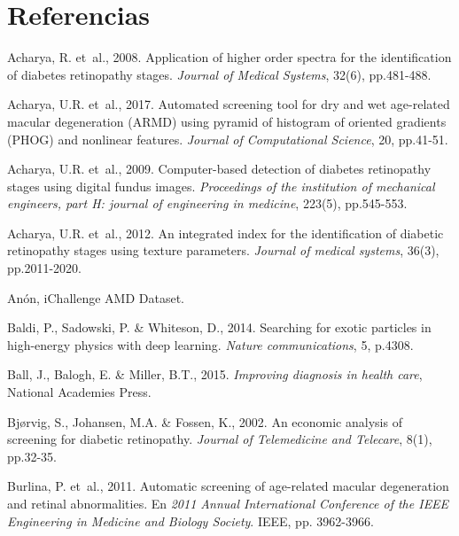 \documentclass[
  12pt,
  spanish,
  a4paperpaper,
]{report}
\begin{document}
\footnotesize

\hypertarget{referencias}{%
\chapter*{Referencias}\label{referencias}}

\hypertarget{refs}{}
\leavevmode\hypertarget{ref-acharya2008application}{}%
Acharya, R. et~al., 2008. Application of higher order spectra for the
identification of diabetes retinopathy stages. \emph{Journal of Medical
Systems}, 32(6), pp.481-488.

\leavevmode\hypertarget{ref-acharya2017automated}{}%
Acharya, U.R. et~al., 2017. Automated screening tool for dry and wet
age-related macular degeneration (ARMD) using pyramid of histogram of
oriented gradients (PHOG) and nonlinear features. \emph{Journal of
Computational Science}, 20, pp.41-51.

\leavevmode\hypertarget{ref-acharya2009computer}{}%
Acharya, U.R. et~al., 2009. Computer-based detection of diabetes
retinopathy stages using digital fundus images. \emph{Proceedings of the
institution of mechanical engineers, part H: journal of engineering in
medicine}, 223(5), pp.545-553.

\leavevmode\hypertarget{ref-acharya2012integrated}{}%
Acharya, U.R. et~al., 2012. An integrated index for the identification
of diabetic retinopathy stages using texture parameters. \emph{Journal
of medical systems}, 36(3), pp.2011-2020.

\leavevmode\hypertarget{ref-ichallenge}{}%
Anón, iChallenge AMD Dataset.

\leavevmode\hypertarget{ref-baldi2014searching}{}%
Baldi, P., Sadowski, P. \& Whiteson, D., 2014. Searching for exotic
particles in high-energy physics with deep learning. \emph{Nature
communications}, 5, p.4308.

\leavevmode\hypertarget{ref-ball2015improving}{}%
Ball, J., Balogh, E. \& Miller, B.T., 2015. \emph{Improving diagnosis in
health care}, National Academies Press.

\leavevmode\hypertarget{ref-bjorvig2002economic}{}%
Bjørvig, S., Johansen, M.A. \& Fossen, K., 2002. An economic analysis of
screening for diabetic retinopathy. \emph{Journal of Telemedicine and
Telecare}, 8(1), pp.32-35.

\leavevmode\hypertarget{ref-burlina2011automatic}{}%
Burlina, P. et~al., 2011. Automatic screening of age-related macular
degeneration and retinal abnormalities. En \emph{2011 Annual
International Conference of the IEEE Engineering in Medicine and Biology
Society}. IEEE, pp. 3962-3966.
\end{document}
